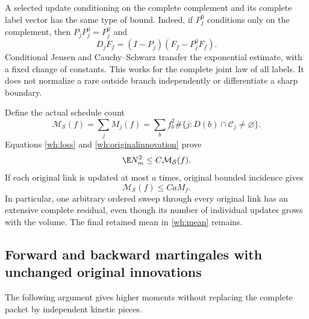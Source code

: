 A selected update conditioning on the complete complement and its complete label vector has the same type of bound. Indeed, if \(P_j^0\) conditions only on the complement, then \(P_jP_j^0=P_j^0\) and
\[
 D_jF_f=(I-P_j)(F_f-P_j^0F_f).
\]
Conditional Jensen and Cauchy--Schwarz transfer the exponential estimate, with a fixed change of constants. This works for the complete joint law of all labels. It does not normalize a rare outside branch independently or differentiate a sharp boundary.

Define the actual schedule count
\begin{equation}
 \mathcal M_{\mathcal S}(f)=\sum_jM_j(f)
 =\sum_b f_b^2\#\{j:D(b)\cap\mathcal C_j\ne\varnothing\}.
 \label{wh:count}
\end{equation}
Equations \eqref{wh:loss} and \eqref{wh:originalinnovation} prove
\begin{equation}
 \E N_m^2\le C\mathcal M_{\mathcal S}(f).
 \label{wh:historyvariance}
\end{equation}
If each original link is updated at most \(a\) times, original bounded incidence gives
\[
 \mathcal M_{\mathcal S}(f)\le CaM_f.
\]
In particular, one arbitrary ordered sweep through every original link has an extensive complete residual, even though its number of individual updates grows with the volume. The final retained mean in \eqref{wh:mean} remains.

\subsection{Forward and backward martingales with unchanged original innovations}

The following argument gives higher moments without replacing the complete packet by independent kinetic pieces.


